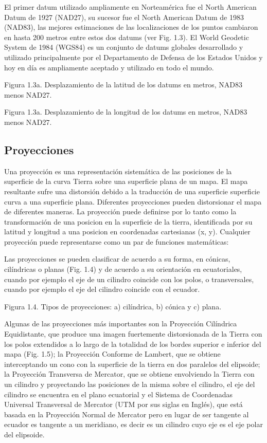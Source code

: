 \documentclass[final,fmstyle]{fpunathesis}
\begin{document}
El primer datum utilizado ampliamente en Norteamérica fue el North American Datum de 1927 (NAD27), su sucesor fue el North American Datum de 1983 (NAD83), las mejores estimaciones de las localizaciones de los puntos cambiaron en hasta 200 metros entre estos dos datums (ver Fig. 1.3). El World Geodetic System de 1984 (WGS84) es un conjunto de datums globales desarrollado y utilizado principalmente por el Departamento de Defensa de los Estados Unidos y hoy en día es ampliamente aceptado y utilizado en todo el mundo.

Figura 1.3a. Desplazamiento de la latitud de los datums en metros, NAD83 menos NAD27.

Figura 1.3a. Desplazamiento de la longitud de los datums en metros, NAD83 menos NAD27.

\subsection{Proyecciones}

Una proyección es una representación sistemática de las posiciones de la superficie de la curva Tierra sobre una superficie plana de un mapa. El mapa resultante sufre una distorsión debido a la traducción de una superficie superficie curva a una superficie plana. Diferentes proyecciones pueden distorsionar el mapa de diferentes maneras. La proyección puede definirse por lo tanto como la transformación de una posicion en la superficie de la tierra, identificada por su latitud y longitud 
a una posicion en coordenadas cartesianas (x, y). Cualquier proyección puede representarse como un par de funciones matemáticas:


Las proyecciones se pueden clasificar de acuerdo a su forma, en cónicas, cilíndricas o planas (Fig. 1.4) y de acuerdo a su orientación en ecuatoriales, cuando por ejemplo el eje de un cilindro coincide con los polos, o transversales, cuando por ejemplo el eje del cilindro coincide con el ecuador. 

Figura 1.4. Tipos de proyecciones: a) cilíndrica, b) cónica y c) plana.

Algunas de las proyecciones más importantes son la Proyección Cilíndrica Equidistante, que produce una imagen fuertemente distorsionada de la Tierra con los polos extendidos a lo largo de la totalidad de los bordes superior e inferior del mapa (Fig. 1.5); la Proyección Conforme de Lambert, que se obtiene interceptando un cono con la superficie de la tierra en dos paralelos del elipsoide; la Proyección Transversa de Mercator, que se obtiene envolviendo la Tierra con un cilindro y proyectando las posiciones de la misma sobre el cilindro, el eje del cilindro se encuentra en el plano ecuatorial y el Sistema de Coordenadas Universal Transversal de Mercator (UTM por sus siglas en Inglés), que está basada en la Proyección Normal de Mercator pero en lugar de ser tangente al ecuador es tangente a un meridiano, es decir es un cilindro cuyo eje es el eje polar del elipsoide. 
\end{document}
